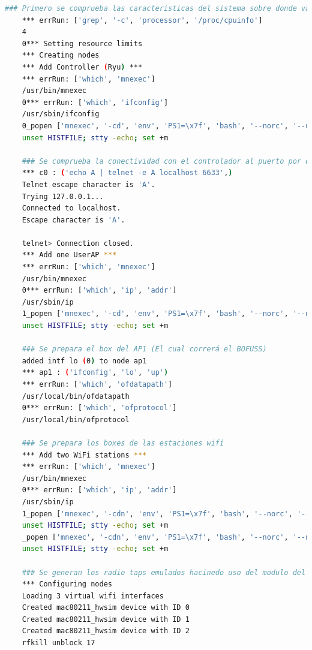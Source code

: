 \begin{lstlisting}[language= bash, style=Consola, caption={Traza de la puesta en marcha del escenario básico},label=code:trazatopobasic]
    ### Primero se comprueba las caracteristicas del sistema sobre donde va a correr
    *** errRun: ['grep', '-c', 'processor', '/proc/cpuinfo'] 
    4
    0*** Setting resource limits
    *** Creating nodes
    *** Add Controller (Ryu) ***
    *** errRun: ['which', 'mnexec'] 
    /usr/bin/mnexec
    0*** errRun: ['which', 'ifconfig'] 
    /usr/sbin/ifconfig
    0_popen ['mnexec', '-cd', 'env', 'PS1=\x7f', 'bash', '--norc', '--noediting', '-is', 'mininet:c0'] 359891*** c0 : ('unset HISTFILE; stty -echo; set +m',)
    unset HISTFILE; stty -echo; set +m

    ### Se comprueba la conectividad con el controlador al puerto por defecto haciendole un telnet 
    *** c0 : ('echo A | telnet -e A localhost 6633',)
    Telnet escape character is 'A'.
    Trying 127.0.0.1...
    Connected to localhost.
    Escape character is 'A'.

    telnet> Connection closed.
    *** Add one UserAP ***
    *** errRun: ['which', 'mnexec'] 
    /usr/bin/mnexec
    0*** errRun: ['which', 'ip', 'addr'] 
    /usr/sbin/ip
    1_popen ['mnexec', '-cd', 'env', 'PS1=\x7f', 'bash', '--norc', '--noediting', '-is', 'mininet:ap1'] 359897*** ap1 : ('unset HISTFILE; stty -echo; set +m',)
    unset HISTFILE; stty -echo; set +m

    ### Se prepara el box del AP1 (El cual correrá el BOFUSS)
    added intf lo (0) to node ap1
    *** ap1 : ('ifconfig', 'lo', 'up')
    *** errRun: ['which', 'ofdatapath'] 
    /usr/local/bin/ofdatapath
    0*** errRun: ['which', 'ofprotocol'] 
    /usr/local/bin/ofprotocol

    ### Se prepara los boxes de las estaciones wifi
    *** Add two WiFi stations ***
    *** errRun: ['which', 'mnexec'] 
    /usr/bin/mnexec
    0*** errRun: ['which', 'ip', 'addr'] 
    /usr/sbin/ip
    1_popen ['mnexec', '-cdn', 'env', 'PS1=\x7f', 'bash', '--norc', '--noediting', '-is', 'mininet:sta1'] 359904*** sta1 : ('unset HISTFILE; stty -echo; set +m',)
    unset HISTFILE; stty -echo; set +m
    _popen ['mnexec', '-cdn', 'env', 'PS1=\x7f', 'bash', '--norc', '--noediting', '-is', 'mininet:sta2'] 359906*** sta2 : ('unset HISTFILE; stty -echo; set +m',)
    unset HISTFILE; stty -echo; set +m

    ### Se generan los radio taps emulados hacinedo uso del modulo del kernel mac80211_hwsim
    *** Configuring nodes
    Loading 3 virtual wifi interfaces
    Created mac80211_hwsim device with ID 0
    Created mac80211_hwsim device with ID 1
    Created mac80211_hwsim device with ID 2
    rfkill unblock 17


\end{lstlisting}
